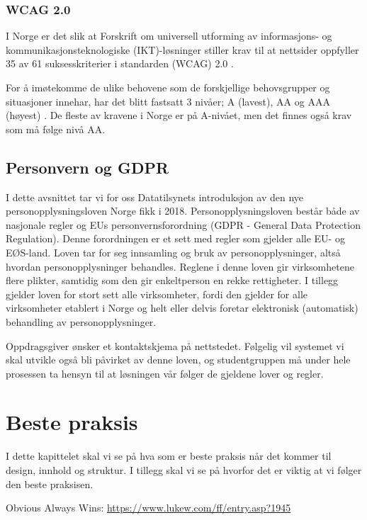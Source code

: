 \subsubsection{WCAG 2.0}

I Norge er det slik at Forskrift om universell utforming av informasjons- og kommunikasjonsteknologiske (IKT)-løsninger \cite{lovdata2013fou} stiller krav til at nettsider oppfyller 35 av 61 suksesskriterier i standarden  (WCAG) 2.0 \cite{difi2018wca}. 

For å imøtekomme de ulike behovene som de forskjellige behovsgrupper og situasjoner innehar, har det blitt fastsatt 3 nivåer; A (lavest), AA og AAA (høyest) \cite{w3c2008wca}. De fleste av kravene i Norge er på A-nivået, men det finnes også krav som må følge nivå AA.

\subsection{Personvern og GDPR}
I dette avsnittet tar vi for oss Datatilsynets \cite{data2018opm} introduksjon av den nye personopplysningsloven Norge fikk i 2018. Personopplysningsloven består både av nasjonale regler og EUs personvernsforordning (GDPR - General Data Protection Regulation). Denne forordningen er et sett med regler som gjelder alle EU- og EØS-land. Loven tar for seg innsamling og bruk av personopplysninger, altså hvordan personopplysninger behandles. Reglene i denne loven gir virksomhetene flere plikter, samtidig som den gir enkeltperson en rekke rettigheter. I tillegg gjelder loven for stort sett alle virksomheter, fordi den gjelder for alle virksomheter etablert i Norge og helt eller delvis foretar elektronisk (automatisk) behandling av personopplysninger. 

Oppdragsgiver ønsker et kontaktskjema på nettstedet. Følgelig vil systemet vi skal utvikle også bli påvirket av denne loven, og studentgruppen må under hele prosessen ta hensyn til at løsningen vår følger de gjeldene lover og regler.

\section{Beste praksis}

I dette kapittelet skal vi se på hva som er beste praksis når det kommer til design, innhold og struktur. I tillegg skal vi se på hvorfor det er viktig at vi følger den beste praksisen.

Obvious Always Wins:
\url{https://www.lukew.com/ff/entry.asp?1945}


